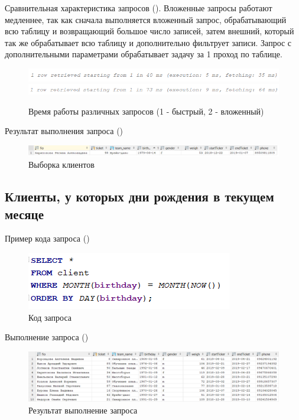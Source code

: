 \documentclass[a4paper,14pt]{article}
\begin{document}
 	Сравнительная характеристика запросов ().
 	Вложенные запросы работают медленнее, так как сначала выполняется вложенный запрос, обрабатывающий всю таблицу и возвращающий большое число записей, затем внешний, который так же обрабатывает всю таблицу и дополнительно фильтрует записи. Запрос с дополнительными параметрами обрабатывает задачу за 1 проход по таблице.
 
	 \begin{figure}[H]
	 	\centering		
	 	\includegraphics[width=\linewidth]{image/selectLab_02_01_Time}
	 	\includegraphics[width=\linewidth]{image/selectLab_02_02_Time}
	 	\caption{Время работы различных запросов (1 - быстрый, 2 - вложенный)}\label{img:selectLab_02_01_Time}
	 \end{figure}
 
 	Результат выполнения запроса ()
	 \begin{figure}[H]
		\centering		
		\includegraphics[width=\linewidth]{image/selectLab_02_01_Res}
		\caption{Выборка клиентов}\label{img:selectLab_02_01_Res}
	\end{figure} 

\subsection{Клиенты, у которых дни рождения в текущем месяце}

	Пример кода запроса ()
	
	\begin{figure}[H]
		\centering		
		\includegraphics[width=0.4\linewidth]{image/selectLab_02_03}
		\caption{Код запроса}\label{img:selectLab_02_03}
	\end{figure}
	
	Выполнение запроса ()
	
	\begin{figure}[H]
		\centering		
		\includegraphics[width=\linewidth]{image/selectLab_02_03_Res}
		\caption{Результат выполнение запроса}\label{img:selectLab_02_03_Res}
	\end{figure}
	
\end{document}
